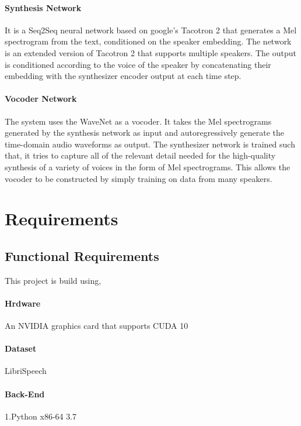 \documentclass[12pt]{report}
\begin{document}
\subsubsection{Synthesis Network} It is a Seq2Seq neural network based on google’s Tacotron 2 that generates a Mel spectrogram from the text, conditioned on the speaker embedding. The network is an extended version of Tacotron 2 that supports multiple speakers. The output is conditioned according to the voice of the speaker by concatenating their embedding with the synthesizer encoder output at each time step.\\

\subsubsection{Vocoder Network} The system uses the WaveNet as a vocoder. It takes the Mel spectrograms generated by the synthesis network as input and autoregressively generate the time-domain audio waveforms as output. The synthesizer network is trained such that, it tries to capture all of the relevant detail needed for the high-quality synthesis of a variety of voices in the form of Mel spectrograms. This allows the vocoder to be constructed by simply training on data from many speakers.


\chapter{ Requirements}

\section{Functional Requirements}
This project is build using,\\
\subsubsection{Hrdware}An NVIDIA graphics card that supports CUDA 10\\
\subsubsection{Dataset} LibriSpeech\\
\subsubsection{Back-End}  
1.Python x86-64 3.7\\
\end{document}
